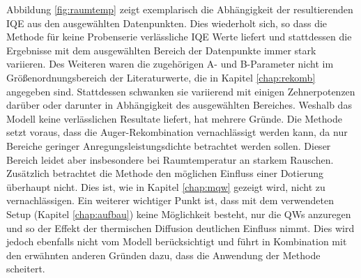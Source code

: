 \noindent 
Abbildung \ref{fig:raumtemp} zeigt exemplarisch die Abhängigkeit der resultierenden IQE aus den ausgewählten Datenpunkten.
Dies wiederholt sich, so dass die Methode für keine Probenserie verlässliche IQE Werte liefert und stattdessen die Ergebnisse mit dem ausgewählten Bereich der Datenpunkte immer stark variieren.
\newline
Des Weiteren waren die zugehörigen A- und B-Parameter nicht im Größenordnungsbereich der Literaturwerte, die in Kapitel \ref{chap:rekomb} angegeben sind. Stattdessen schwanken sie variierend mit einigen Zehnerpotenzen darüber oder darunter in Abhängigkeit des ausgewählten Bereiches.
\newline
Weshalb das Modell keine verlässlichen Resultate liefert, hat mehrere Gründe. 
Die Methode setzt voraus, dass die Auger-Rekombination vernachlässigt werden kann, da nur Bereiche geringer Anregungsleistungsdichte betrachtet werden sollen. Dieser Bereich leidet aber insbesondere bei Raumtemperatur an starkem Rauschen. 
\newline
Zusätzlich betrachtet die Methode den möglichen Einfluss einer Dotierung überhaupt nicht. Dies ist, wie in Kapitel \ref{chap:mqw} gezeigt wird, nicht zu vernachlässigen.
\newline
Ein weiterer wichtiger Punkt ist, dass mit dem verwendeten Setup (Kapitel \ref{chap:aufbau}) keine Möglichkeit besteht, nur die QWs anzuregen und so der Effekt der thermischen Diffusion  deutlichen Einfluss nimmt. Dies wird jedoch ebenfalls nicht vom Modell berücksichtigt und führt in Kombination mit den erwähnten anderen Gründen dazu, dass die Anwendung der Methode scheitert.
\newline

